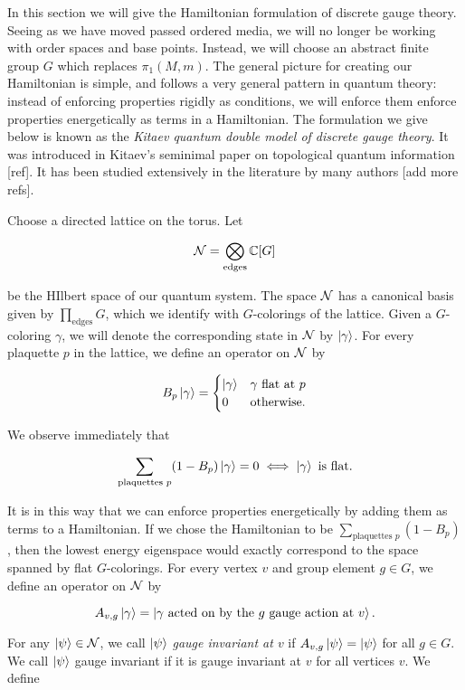 In this section we will give the Hamiltonian formulation of discrete gauge theory. Seeing as we have moved passed ordered media, we will no longer be working with order spaces and base points. Instead, we will choose an abstract finite group $G$ which replaces $\pi_1(M,m)$. The general picture for creating our Hamiltonian is simple, and follows a very general pattern in quantum theory: instead of enforcing properties rigidly as conditions, we will enforce them enforce properties energetically as terms in a Hamiltonian. The formulation we give below is known as the \textit{Kitaev quantum double model of discrete gauge theory}. It was introduced in Kitaev's seminimal paper on topological quantum information [ref]. It has been studied extensively in the literature by many authors [add more refs].

Choose a directed lattice on the torus. Let

$$\mathcal{N}=\bigotimes_{\text{edges}}\mathbb{C}[G]$$

be the HIlbert space of our quantum system. The space $\mathcal{N}$ has a canonical basis given by $\prod_{\text{edges}}G$, which we  identify with $G$-colorings of the lattice. Given a $G$-coloring $\gamma$, we will denote the corresponding state in $\mathcal{N}$ by $\ket{\gamma}$. For every plaquette $p$ in the lattice, we define an operator on $\mathcal{N}$ by

$$B_p\ket{\gamma}=
\begin{cases}
\ket{\gamma} & \gamma \text{ flat at }p\\
0 & \text{otherwise}.
\end{cases}$$

We observe immediately that

$$\sum_{\text{plaquettes }p}(1-B_p)\ket{\gamma}=0 \iff \ket{\gamma} \text{ is flat.}$$

It is in this way that we can enforce properties energetically by adding them as terms to a Hamiltonian. If we chose the Hamiltonian to be $\sum_{\text{plaquettes }p}(1-B_p)$, then the lowest energy eigenspace would exactly correspond to the space spanned by flat $G$-colorings. For every vertex $v$ and group element $g\in G$, we define an operator on $\mathcal{N}$ by

$$A_{v,g}\ket{\gamma}=\ket{\gamma \text{ acted on by the $g$ gauge action at $v$}}.$$

For any $\ket{\psi}\in \mathcal{N}$, we call $\ket{\psi}$ \textit{gauge invariant at $v$} if $A_{v,g}\ket{\psi}=\ket{\psi}$ for all $g\in G$. We call $\ket{\psi}$ gauge invariant if it is gauge invariant at $v$ for all vertices $v$. We define

